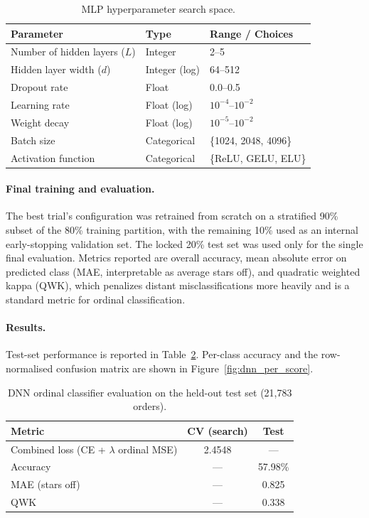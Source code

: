 \documentclass[11pt]{article}
\begin{document}
\begin{table}[H]
\centering
\caption{MLP hyperparameter search space.}
\label{tab:dnn_search}
\begin{tabular}{lll}
\toprule
Parameter & Type & Range / Choices \\
\midrule
Number of hidden layers ($L$) & Integer          & 2--5 \\
Hidden layer width ($d$)       & Integer (log)    & 64--512 \\
Dropout rate                   & Float            & 0.0--0.5 \\
Learning rate                  & Float (log)      & $10^{-4}$--$10^{-2}$ \\
Weight decay                   & Float (log)      & $10^{-5}$--$10^{-2}$ \\
Batch size                     & Categorical      & \{1024, 2048, 4096\} \\
Activation function            & Categorical      & \{ReLU, GELU, ELU\} \\
\bottomrule
\end{tabular}
\end{table}

\paragraph{Final training and evaluation.}
The best trial's configuration was retrained from scratch on a stratified 90\% subset of the 80\% training partition, with the remaining 10\% used as an internal early-stopping validation set. The locked 20\% test set was used only for the single final evaluation. Metrics reported are overall accuracy, mean absolute error on predicted class (MAE, interpretable as average stars off), and quadratic weighted kappa (QWK), which penalizes distant misclassifications more heavily and is a standard metric for ordinal classification.

\paragraph{Results.}
Test-set performance is reported in Table~\ref{tab:dnn_results}. Per-class accuracy and the row-normalised confusion matrix are shown in Figure~\ref{fig:dnn_per_score}.

\begin{table}[H]
\centering
\caption{DNN ordinal classifier evaluation on the held-out test set (21{,}783 orders).}
\label{tab:dnn_results}
\begin{tabular}{lcc}
\toprule
Metric & CV (search) & Test \\
\midrule
Combined loss (CE + $\lambda$ ordinal MSE) & 2.4548 & --- \\
Accuracy           & ---    & 57.98\% \\
MAE (stars off)    & ---    & 0.825 \\
QWK                & ---    & 0.338 \\
\bottomrule
\end{tabular}
\end{table}
\end{document}
